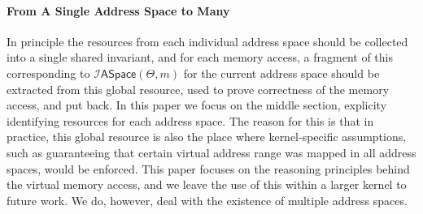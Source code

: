   


\paragraph{From A Single Address Space to Many}
In principle the resources from each individual address space should be collected into a single
shared invariant, and for each memory access,
a fragment of this corresponding to $\mathcal{I}\textsf{ASpace}(\Theta,m)$
for the current address space should be extracted from this global resource, used to prove correctness of the
memory access, and put back.
In this paper we focus on the middle section, explicity identifying resources for each
address space. The reason for this is that in practice, this global resource is also
the place where kernel-specific assumptions, such as guaranteeing that certain virtual address range
was mapped in all address spaces, would be enforced. This paper focuses on the
reasoning principles behind the virtual memory access, and we leave the use of this within a larger
kernel to future work. We do, however, deal with the existence of multiple address spaces.


